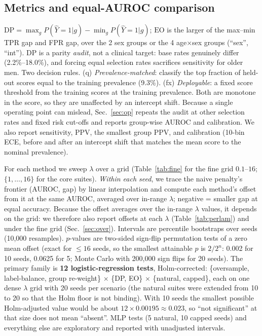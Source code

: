 \documentclass[conference]{IEEEtran}
\newcommand{\DP}{\mathrm{DP}}
\newcommand{\EO}{\mathrm{EO}}
\begin{document}
\subsection{Metrics and equal-AUROC comparison}
\label{sec:eval}
$\DP=\max_g P(\hat Y{=}1|g)-\min_g P(\hat Y{=}1|g)$; $\EO$ is the larger of the max--min TPR gap and FPR gap, over the 2 sex groups or the 4 age$\times$sex groups (``sex'', ``int''). DP is a parity \emph{audit}, not a clinical target: base rates genuinely differ (2.2\%--18.0\%), and forcing equal selection rates sacrifices sensitivity for older men. Two decision rules. (q) \emph{Prevalence-matched}: classify the top fraction of held-out scores equal to the training prevalence (9.3\%). (fx) \emph{Deployable}: a fixed score threshold from the training scores at the training prevalence. Both are monotone in the score, so they are unaffected by an intercept shift. Because a single operating point can mislead, Sec.~\ref{sec:op} repeats the audit at other selection rates and fixed risk cut-offs and reports group-wise AUROC and calibration. We also report sensitivity, PPV, the smallest group PPV, and calibration (10-bin ECE, before and after an intercept shift that matches the mean score to the nominal prevalence).

For each method we sweep $\lambda$ over a grid (Table~\ref{tab:fine} for the fine grid $0.1$--$16$; $\{1,\dots,16\}$ for the core suites). \emph{Within each seed}, we trace the naive penalty's frontier (AUROC, gap) by linear interpolation and compute each method's offset from it at the same AUROC, averaged over in-range $\lambda$; negative = smaller gap at equal accuracy. Because the offset averages over the in-range $\lambda$ values, it depends on the grid: we therefore also report offsets at each $\lambda$ (Table~\ref{tab:perlam}) and under the fine grid (Sec.~\ref{sec:over}). Intervals are percentile bootstraps over seeds (10,000 resamples). $p$-values are two-sided sign-flip permutation tests of a zero mean offset (exact for $\le16$ seeds, so the smallest attainable $p$ is $2/2^{n}$: 0.002 for 10 seeds, 0.0625 for 5; Monte Carlo with 200{,}000 sign flips for 20 seeds). The primary family is \textbf{12 logistic-regression tests}, Holm-corrected: \{oversample, label-balance, group re-weight\} $\times$ \{DP, EO\} $\times$ \{natural, capped\}, each on one dense $\lambda$ grid with 20 seeds per scenario (the natural suites were extended from 10 to 20 so that the Holm floor is not binding). With 10 seeds the smallest possible Holm-adjusted value would be about $12\times0.00195\approx0.023$, so ``not significant'' at that size does not mean ``absent''. MLP tests (5 natural, 10 capped seeds) and everything else are exploratory and reported with unadjusted intervals.
\end{document}
